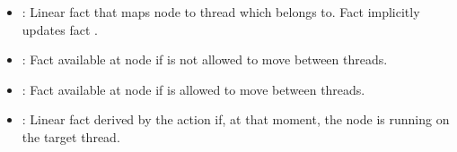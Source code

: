 \begin{itemize}

   \item {}: Linear fact that maps node 
      to thread  which  belongs to. Fact 
      implicitly updates fact .

   \item {}: Fact available at node  if
       is not allowed to move between threads.

   \item {}: Fact available at node  if
       is allowed to move between threads.

   \item {}: Linear fact derived by the
       action if, at that moment, the node  is running
      on the target thread.

\end{itemize}

